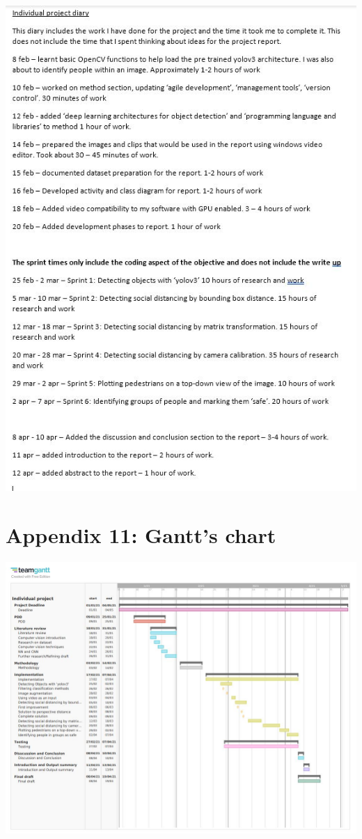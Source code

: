 \documentclass[12pt]{report}
\begin{document}
\includegraphics[width=160mm]{./diary.JPG}

\pagebreak
\section*{Appendix 11: Gantt's chart}

\includegraphics[width=160mm]{./gantt.JPG}
\end{document}
